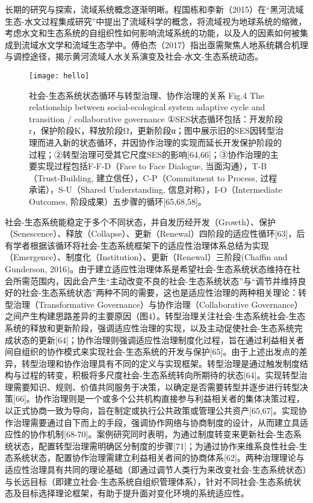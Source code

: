 长期的研究与探索，流域系统概念逐渐明晰。程国栋和李新（2015）在“黑河流域生态-水文过程集成研究”中提出了流域科学的概念，将流域视为地球系统的缩微，考虑水文和生态系统的自组织性如何影响流域系统的功能，以及人的因素如何被集成到流域水文学和流域生态学中。傅伯杰（2017）指出亟需聚焦人地系统耦合机理与调控途径，揭示黄河流域人水关系演变及社会-水文-生态系统动态。

\begin{figure}[htb] %
    \centering
    \texttt{[image: hello]}
    \caption[社会-生态系统状态循环]{社会-生态系统状态循环与转型治理、协作治理的关系
    Fig.4  The relationship between social-ecological system adaptive cycle and transition / collaborative governance
    ①SES状态循环包括：开发阶段r，保护阶段K，释放阶段Ω，更新阶段α；图中展示旧的SES因转型治理而进入新的状态循环，并因协作治理的实现而延长开发保护阶段的过程；②转型治理可受其它尺度SES的影响[64,66]；③协作治理的主要实现过程包括F-F-D（Face to Face Dialogue, 当面沟通），T-B（Trust-Building, 建立信任），C-P（Commitment to Process, 过程承诺），S-U（Shared Understanding, 信息对称），I-O（Intermediate Outcomes, 阶段成果）五步骤的循环[65,68,58]。}
    \label{fig:xfig0}
\end{figure}

社会-生态系统能稳定于多个不同状态，并自发历经开发（Growth）、保护（Senescence）、释放（Collapse）、更新（Renewal）四阶段的适应性循环[63]，后有学者根据该循环将社会-生态系统框架下的适应性治理体系总结为实现（Emergence）、制度化（Institution）、更新（Renewal）三阶段(Chaffin and Gunderson, 2016)。由于建立适应性治理体系是希望社会-生态系统状态维持在社会所需范围内，因此会产生“主动改变不良的社会-生态系统状态”与“调节并维持良好的社会-生态系统状态”两种不同的需要，这也是适应性治理的两种相关理论：转型治理（Transformative Governance）与协作治理（Collaborative Governance）之间产生构建思路差异的主要原因（图4）。转型治理关注社会-生态系统社会-生态系统的释放和更新阶段，强调适应性治理的实现，以及主动促使社会-生态系统完成状态的更新[64]；协作治理则强调适应性治理制度化过程，旨在通过利益相关者间自组织的协作模式来实现社会-生态系统的开发与保护[65]。由于上述出发点的差异，转型治理和协作治理具有不同的定义与实现框架。转型治理是通过触发制度结构与过程的转变，积极将多尺度社会-生态系统转向所期待的状态[64]。实现转型治理需要知识、规则、价值共同服务于决策，以确定是否需要转型并逐步进行转型决策[66]。协作治理则是一个或多个公共机构直接参与利益相关者的集体决策过程，以正式协商一致为导向，旨在制定或执行公共政策或管理公共资产[65,67]。实现协作治理需要通过自下而上的手段，强调协作网络与协商制度的设计，从而建立具适应性的协作机制[68-70]。案例研究同时表明，为通过制度转变来更新社会-生态系统状态，配置转型治理需明确区分制度的步骤[71]；为通过协作来维系良性社会-生态系统状态，配置协作治理需建立利益相关者间的协商体系[62]。两种治理理论与适应性治理具有共同的理论基础（即通过调节人类行为来改变社会-生态系统状态）与长远目标（即建立社会-生态系统自组织管理体系），针对不同社会-生态系统状态及目标选择理论框架，有助于提升面对变化环境的系统适应性。

